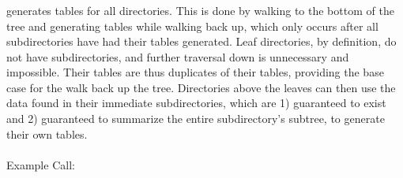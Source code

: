 \subsubsection{\gufitreesummaryall}
\gufitreesummaryall generates \treesummary tables for all
directories. This is done by walking to the bottom of the tree and
generating \treesummary tables while walking back up, which only
occurs after all subdirectories have had their \treesummary tables
generated. Leaf directories, by definition, do not have
subdirectories, and further traversal down is unnecessary and
impossible. Their \treesummary tables are thus duplicates of their
\summary tables, providing the base case for the walk back up the
tree. Directories above the leaves can then use the \treesummary data
found in their immediate subdirectories, which are 1) guaranteed to
exist and 2) guaranteed to summarize the entire subdirectory's
subtree, to generate their own \treesummary tables.
\\\\
Example Call:
\\\\
\indent \gufitreesummaryall \indexroot
